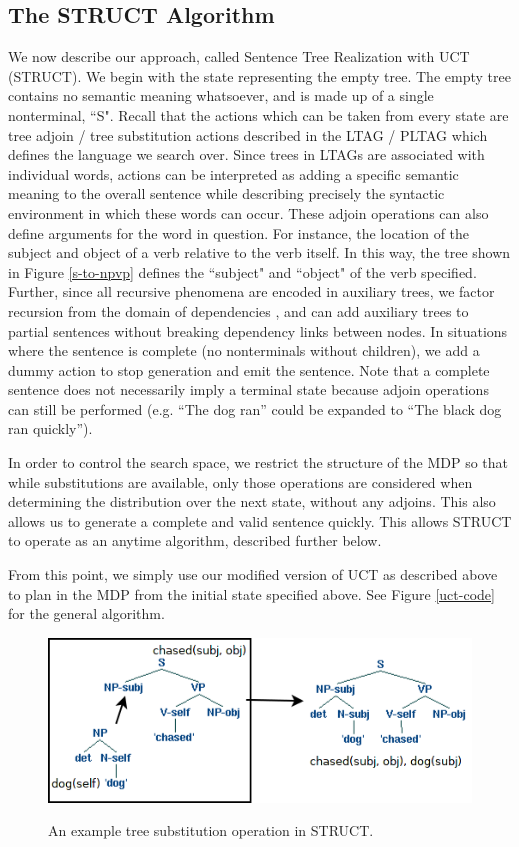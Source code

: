 \subsection{The STRUCT Algorithm}
We now describe our approach, called Sentence Tree Realization with
UCT (STRUCT).
We begin with the state representing the empty tree.  The empty tree
contains no semantic meaning whatsoever, and is made up of a single
nonterminal, ``S".  Recall that the actions which can be taken from
every state are tree adjoin / tree substitution actions described in the
LTAG / PLTAG which defines the language we search over.
Since trees in LTAGs are associated
with individual words, actions can be interpreted as adding a specific
semantic meaning to the overall sentence while describing precisely
the syntactic environment in which these words can occur.
These adjoin operations can also
define arguments for the word in question.  For instance, the
location of the subject and object of a verb relative to the verb itself.
In this way, the tree shown in Figure \ref{s-to-npvp} defines the
``subject" and ``object" of the verb specified.
Further, since all recursive phenomena are
encoded in auxiliary trees, we factor recursion from the domain of
dependencies \cite{bauer2009statistical}, and can add auxiliary trees
to partial sentences without breaking dependency links between nodes.
In situations where the sentence is complete (no nonterminals without
children), we add a dummy action to stop generation and emit the
sentence.  Note that a complete sentence does not necessarily imply
a terminal state because adjoin operations can still be performed
(e.g. ``The dog ran'' could be expanded to ``The black dog ran quickly'').

In order to control the search space, we restrict the structure of the
MDP so that while substitutions are available, only those operations
are considered when determining the distribution over the next state,
without any adjoins.  This also allows us to generate a
complete and valid sentence quickly.  This allows STRUCT to operate as
an anytime algorithm, described further below.

From this point, we simply use our modified version of UCT as described
above to plan in the MDP from the initial state specified above.  See
Figure \ref{uct-code} for the general algorithm.

\begin{figure}[t]
\centering
\includegraphics[width= 0.7 \linewidth]{sub-example.png}\label{examples-s}
\caption{An example tree substitution operation in STRUCT.}
\end{figure}

